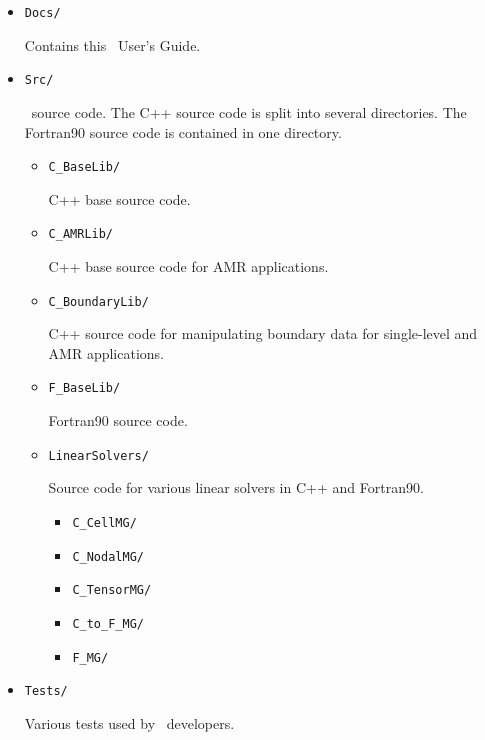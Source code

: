\begin{itemize}

\item {\tt Docs/}

Contains this \BoxLib\ User's Guide.

\item {\tt Src/}

  \BoxLib\ source code.  The C++ source code is split into several directories.
  The Fortran90 source code is contained in one directory.

  \begin{itemize}

    \item {\tt C\_BaseLib/}

    C++ base source code.

    \item {\tt C\_AMRLib/}

    C++ base source code for AMR applications.

    \item {\tt C\_BoundaryLib/}

    C++ source code for manipulating boundary data for single-level and AMR applications.

    \item {\tt F\_BaseLib/}

    Fortran90 source code.

    \item {\tt LinearSolvers/}

    Source code for various linear solvers in C++ and Fortran90.

    \begin{itemize}

      \item {\tt C\_CellMG/}
      \item {\tt C\_NodalMG/}
      \item {\tt C\_TensorMG/}
      \item {\tt C\_to\_F\_MG/}
      \item {\tt F\_MG/}

    \end{itemize}

  \end{itemize}

\item {\tt Tests/}

  Various tests used by \BoxLib\ developers.

  \begin{itemize}


\end{itemize}
\end{itemize}
